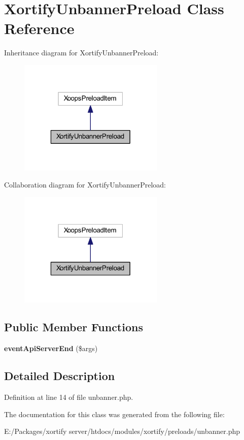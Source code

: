 \hypertarget{class_xortify_unbanner_preload}{\section{Xortify\-Unbanner\-Preload Class Reference}
\label{class_xortify_unbanner_preload}
}


Inheritance diagram for Xortify\-Unbanner\-Preload\-:
\nopagebreak
\begin{figure}[H]
\begin{center}
\leavevmode
\includegraphics[width=196pt]{class_xortify_unbanner_preload__inherit__graph}
\end{center}
\end{figure}


Collaboration diagram for Xortify\-Unbanner\-Preload\-:
\nopagebreak
\begin{figure}[H]
\begin{center}
\leavevmode
\includegraphics[width=196pt]{class_xortify_unbanner_preload__coll__graph}
\end{center}
\end{figure}
\subsection*{Public Member Functions}
\begin{DoxyCompactItemize}
\item 
\hypertarget{class_xortify_unbanner_preload_a62e459a2f1d1676b74b93eaa0e01bd02}{{\bfseries event\-Api\-Server\-End} (\$args)}\label{class_xortify_unbanner_preload_a62e459a2f1d1676b74b93eaa0e01bd02}

\end{DoxyCompactItemize}


\subsection{Detailed Description}


Definition at line 14 of file unbanner.\-php.



The documentation for this class was generated from the following file\-:\begin{DoxyCompactItemize}
\item 
E\-:/\-Packages/xortify server/htdocs/modules/xortify/preloads/unbanner.\-php\end{DoxyCompactItemize}
